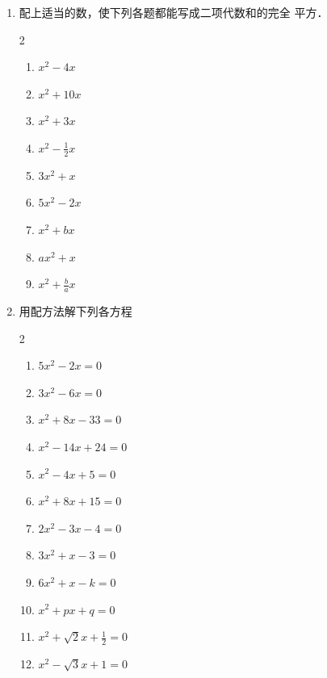 \begin{enumerate}
\item 配上适当的数，使下列各题都能写成二项代数和的完全
平方．
    \begin{multicols}{2}
        \begin{enumerate}
\item $x^2-4x$
\item $x^2+10x$
\item $x^2+3x$
\item $x^2-\frac{1}{2}x$
\item $3x^2+x$
\item $5x^2-2x$
\item $x^2+bx$
\item $ ax^2+x$
\item $x^2+\frac{b}{a}x$
\end{enumerate}
\end{multicols}
\item 用配方法解下列各方程
\begin{multicols}{2}
    \begin{enumerate}
\item $5x^2-2x=0$
\item $3x^2-6x=0$
\item $x^2+8x-33=0$
\item $x^2-14x+24=0$
\item $x^2-4x+5=0$
\item $x^2+8x+15=0$
\item $2x^2-3x-4=0$
\item $3x^2+x-3=0$
\item $6x^2+x-k=0$
\item $x^2+px+q=0$
\item $x^2+\sqrt{2}x+\frac{1}{2}=0$
\item $x^2-\sqrt{3}x+1=0$
        \end{enumerate}
    \end{multicols}


\end{enumerate}
